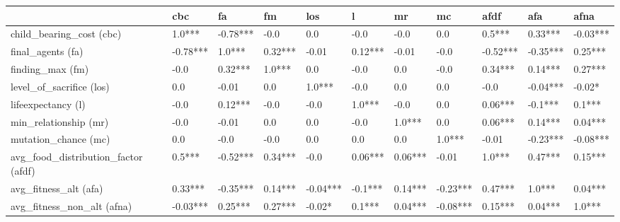 \begin{tabular}{lllllllllll}
    \toprule
{}                                     & cbc      & fa       & fm      & los      & l       & mr      & mc       & afdf     & afa      & afna          \\
    \midrule
child\_bearing\_cost (cbc)             & 1.0***   & -0.78*** & -0.0    & 0.0      & -0.0    & -0.0    & 0.0      & 0.5***   & 0.33***  & -0.03***     \\
final\_agents (fa)                     & -0.78*** & 1.0***   & 0.32*** & -0.01    & 0.12*** & -0.01   & -0.0     & -0.52*** & -0.35*** & 0.25***      \\
finding\_max (fm)                      & -0.0     & 0.32***  & 1.0***  & 0.0      & -0.0    & 0.0     & -0.0     & 0.34***  & 0.14***  & 0.27***      \\
level\_of\_sacrifice (los)             & 0.0      & -0.01    & 0.0     & 1.0***   & -0.0    & 0.0     & 0.0      & -0.0     & -0.04*** & -0.02*       \\
lifeexpectancy (l)                     & -0.0     & 0.12***  & -0.0    & -0.0     & 1.0***  & -0.0    & 0.0      & 0.06***  & -0.1***  & 0.1***       \\
min\_relationship (mr)                 & -0.0     & -0.01    & 0.0     & 0.0      & -0.0    & 1.0***  & 0.0      & 0.06***  & 0.14***  & 0.04***      \\
mutation\_chance (mc)                  & 0.0      & -0.0     & -0.0    & 0.0      & 0.0     & 0.0     & 1.0***   & -0.01    & -0.23*** & -0.08***     \\
avg\_food\_distribution\_factor (afdf) & 0.5***   & -0.52*** & 0.34*** & -0.0     & 0.06*** & 0.06*** & -0.01    & 1.0***   & 0.47***  & 0.15***      \\
avg\_fitness\_alt (afa)                & 0.33***  & -0.35*** & 0.14*** & -0.04*** & -0.1*** & 0.14*** & -0.23*** & 0.47***  & 1.0***   & 0.04***      \\
avg\_fitness\_non\_alt (afna)          & -0.03*** & 0.25***  & 0.27*** & -0.02*   & 0.1***  & 0.04*** & -0.08*** & 0.15***  & 0.04***  & 1.0***       \\
    \bottomrule
\end{tabular}
